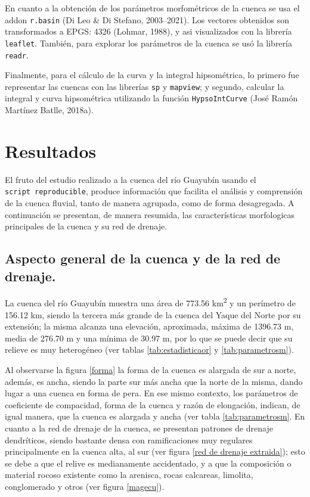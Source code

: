 \documentclass[11pt,]{article}
\begin{document}
En cuanto a la obtención de los parámetros morfométricos de la cuenca se
usa el addon \texttt{r.basin} (Di Leo \& Di Stefano, 2003--2021). Los
vectores obtenidos son transformados a EPGS: 4326 (Lohmar, 1988), y asi
visualizados con la librería \texttt{leaflet}. También, para explorar
los parámetros de la cuenca se usó la librería \texttt{readr}.

Finalmente, para el cálculo de la curva y la integral hipsométrica, lo
primero fue representar las cuencas con las librerías \texttt{sp} y
\texttt{mapview}; y segundo, calcular la integral y curva hipsométrica
utilizando la función \texttt{HypsoIntCurve} (José Ramón Martínez
Batlle, 2018a).

\section{Resultados}\label{resultados}

El fruto del estudio realizado a la cuenca del río Guayubín usando el
\texttt{script\ reproducible}, produce información que facilita el
análisis y comprensión de la cuenca fluvial, tanto de manera agrupada,
como de forma desagregada. A continuación se presentan, de manera
resumida, las características morfologicas principales de la cuenca y su
red de drenaje.

\subsection{Aspecto general de la cuenca y de la red de
drenaje.}\label{aspecto-general-de-la-cuenca-y-de-la-red-de-drenaje.}

La cuenca del río Guayubín muestra una área de 773.56
km\textsuperscript{2} y un perímetro de 156.12 km, siendo la tercera más
grande de la cuenca del Yaque del Norte por su extensión; la misma
alcanza una elevación, aproximada, máxima de 1396.73 m, media de 276.70
m y una mínima de 30.97 m, por lo que se puede decir que su relieve es
muy heterogéneo (ver tablas \ref{tab:estadisticaor} y
\ref{tab:parametrosm}).

Al observarse la figura \ref{forma} la forma de la cuenca es alargada de
sur a norte, además, es ancha, siendo la parte sur más ancha que la
norte de la misma, dando lugar a una cuenca en forma de pera. En ese
mismo contexto, los parámetros de coeficiente de compacidad, forma de la
cuenca y razón de elongación, indican, de igual manera, que la cuenca es
alargada y ancha (ver tabla \ref{tab:parametrosm}. En cuanto a la red de
drenaje de la cuenca, se presentan patrones de drenaje dendríticos,
siendo bastante densa con ramificaciones muy regulares principalmente en
la cuenca alta, al sur (ver figura \ref{red de drenaje extraida}); esto
se debe a que el relive es medianamente accidentado, y a que la
composición o material rocoso existente como la arenisca, rocas
calcareas, limolita, conglomerado y otros (ver figura \ref{magecu}).
\end{document}
